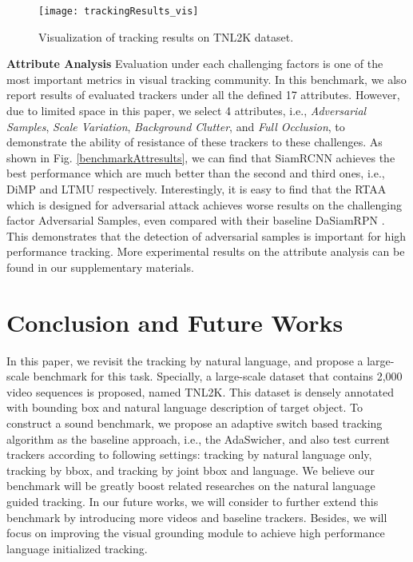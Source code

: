 \documentclass[final]{cvpr}
\begin{document}
\begin{figure}[!htb]
\center
\texttt{[image: trackingResults\_vis]}
\caption{Visualization of tracking results on TNL2K dataset. }
\label{trackingResults_vis}
\end{figure} 	



\textbf{Attribute Analysis } 
Evaluation under each challenging factors is one of the most important metrics in visual tracking community. In this benchmark, we also report results of evaluated trackers under all the defined 17 attributes. However, due to limited space in this paper, we select 4 attributes, i.e., \emph{Adversarial Samples}, \emph{Scale Variation}, \emph{Background Clutter}, and \emph{Full Occlusion}, to demonstrate the ability of resistance of these trackers to these challenges. As shown in Fig. \ref{benchmarkAttresults}, we can find that SiamRCNN \cite{voigtlaender2020siamRCNN} achieves the best performance which are much better than the second and third ones, i.e., DiMP \cite{bhat2019DiMP} and LTMU \cite{dai2020ltmu} respectively. Interestingly, it is easy to find that the RTAA \cite{jia2020TrackAttack} which is designed for adversarial attack achieves worse results on the challenging factor Adversarial Samples, even compared with their baseline DaSiamRPN \cite{zhu2018distractor}. This demonstrates that the detection of adversarial samples is important for high performance tracking. More experimental results on the attribute analysis can be found in our supplementary materials. 



 


 
\section{Conclusion and Future Works} 
In this paper, we revisit the tracking by natural language, and propose a large-scale benchmark for this task. Specially, a large-scale dataset that contains 2,000 video sequences is proposed, named TNL2K. This dataset is densely annotated with bounding box and natural language description of target object. To construct a sound benchmark, we propose an adaptive switch based tracking algorithm as the baseline approach, i.e., the AdaSwicher, and also test current trackers according to following settings: tracking by natural language only, tracking by bbox, and tracking by joint bbox and language. We believe our benchmark will be greatly boost related researches on the natural language guided tracking. In our future works, we will consider to further extend this benchmark by introducing more videos and baseline trackers. Besides, we will focus on improving the visual grounding module to achieve high performance language initialized tracking. 
\end{document}
